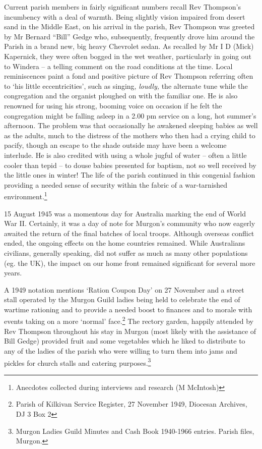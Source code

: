 Current parish members in fairly significant numbers recall Rev Thompson's incumbency with a deal of warmth. Being slightly vision impaired from desert sand in the Middle East, on his arrival in the parish, Rev Thompson was greeted by Mr Bernard ``Bill'' Gedge who, subsequently, frequently drove him around the Parish in a brand new, big heavy Chevrolet sedan. As recalled by Mr I D (Mick) Kapernick, they were often bogged in the wet weather, particularly in going out to Windera -- a telling comment on the road conditions at the time. Local reminiscences paint a fond and positive picture of Rev Thompson referring often to `his little eccentricities', such as singing, \emph{loudly,} the alternate tune while the congregation and the organist ploughed on with the familiar one. He is also renowned for using his strong, booming voice on occasion if he felt the congregation might be falling asleep in a 2.00 pm service on a long, hot summer's afternoon. The problem was that occasionally he awakened sleeping babies as well as the adults, much to the distress of the mothers who then had a crying child to pacify, though an escape to the shade outside may have been a welcome interlude. He is also credited with using a whole jugful of water -- often a little cooler than tepid -- to douse babies presented for baptism, not so well received by the little ones in winter! The life of the parish continued in this congenial fashion providing a needed sense of security within the fabric of a war-tarnished environment.\footnote{Anecdotes collected during interviews and research (M McIntosh)}


15 August 1945 was a momentous day for Australia marking the end of World War II. Certainly, it was a day of note for Murgon's community who now eagerly awaited the return of the final batches of local troops. Although overseas conflict ended, the ongoing effects on the home countries remained. While Australians civilians, generally speaking, did not suffer as much as many other populations (eg. the UK), the impact on our home front remained significant for several more years.



A 1949 notation mentions `Ration Coupon Day' on 27 November and a street stall operated by the Murgon Guild ladies being held to celebrate the end of wartime rationing and to provide a needed boost to finances and to morale with events taking on a more `normal' face.\footnote{Parish of Kilkivan Service Register, 27 November 1949, Diocesan Archives, DJ 3 Box 2} The rectory garden, happily attended by Rev Thompson throughout his stay in Murgon (most likely with the assistance of Bill Gedge) provided fruit and some vegetables which he liked to distribute to any of the ladies of the parish who were willing to turn them into jams and pickles for church stalls and catering purposes.\footnote{Murgon Ladies Guild Minutes and Cash Book 1940-1966 entries. Parish files, Murgon.}


